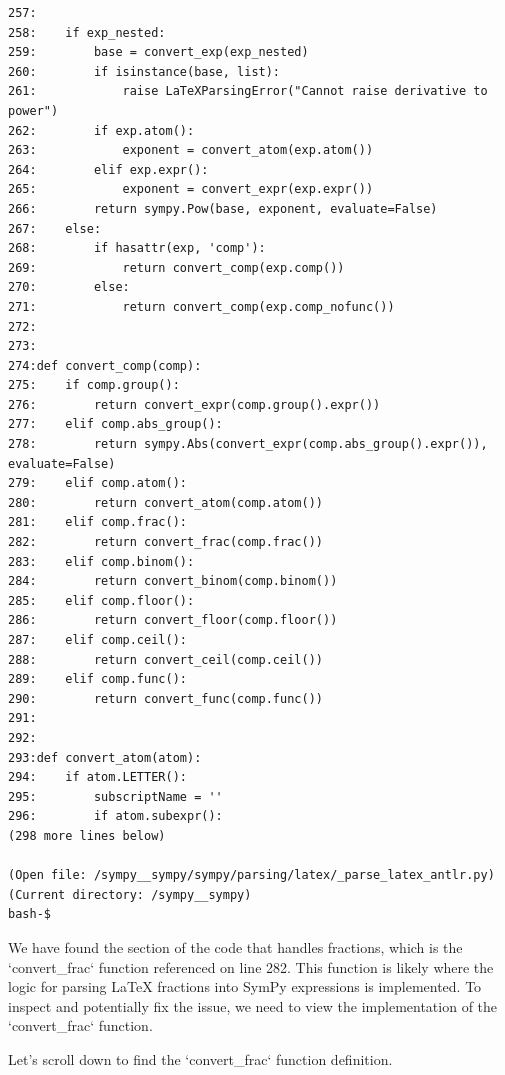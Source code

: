 {\begin{observationbox}
\begin{Verbatim}[breaklines=true, breakanywhere=true]
257:
258:    if exp_nested:
259:        base = convert_exp(exp_nested)
260:        if isinstance(base, list):
261:            raise LaTeXParsingError("Cannot raise derivative to power")
262:        if exp.atom():
263:            exponent = convert_atom(exp.atom())
264:        elif exp.expr():
265:            exponent = convert_expr(exp.expr())
266:        return sympy.Pow(base, exponent, evaluate=False)
267:    else:
268:        if hasattr(exp, 'comp'):
269:            return convert_comp(exp.comp())
270:        else:
271:            return convert_comp(exp.comp_nofunc())
272:
273:
274:def convert_comp(comp):
275:    if comp.group():
276:        return convert_expr(comp.group().expr())
277:    elif comp.abs_group():
278:        return sympy.Abs(convert_expr(comp.abs_group().expr()), evaluate=False)
279:    elif comp.atom():
280:        return convert_atom(comp.atom())
281:    elif comp.frac():
282:        return convert_frac(comp.frac())
283:    elif comp.binom():
284:        return convert_binom(comp.binom())
285:    elif comp.floor():
286:        return convert_floor(comp.floor())
287:    elif comp.ceil():
288:        return convert_ceil(comp.ceil())
289:    elif comp.func():
290:        return convert_func(comp.func())
291:
292:
293:def convert_atom(atom):
294:    if atom.LETTER():
295:        subscriptName = ''
296:        if atom.subexpr():
(298 more lines below)

(Open file: /sympy__sympy/sympy/parsing/latex/_parse_latex_antlr.py)
(Current directory: /sympy__sympy)
bash-$
\end{Verbatim}
\end{observationbox}
\begin{agentbox}
We have found the section of the code that handles fractions, which is the `convert\_frac` function referenced on line 282. This function is likely where the logic for parsing LaTeX fractions into SymPy expressions is implemented. To inspect and potentially fix the issue, we need to view the implementation of the `convert\_frac` function.



Let's scroll down to find the `convert\_frac` function definition.


\end{agentbox}}
